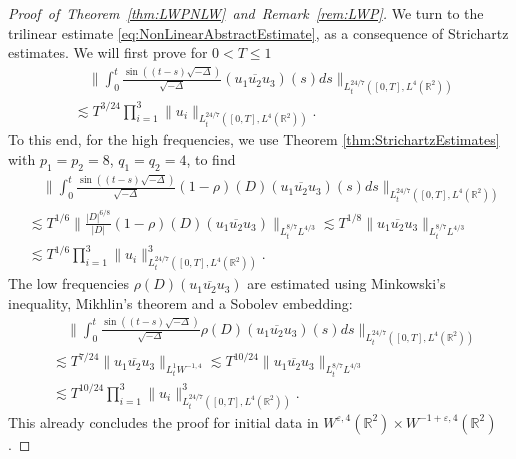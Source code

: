 \documentclass{amsart}
\theoremstyle{definition}
\newcommand{\R}{\mathbb{R}}
\newcommand {\Rtwo}{\mathbb{R}^{2}}
\newcommand {\veps}{\varepsilon}
\numberwithin{equation}{section}
\begin{document}
\begin{proof}[Proof~of~Theorem~\ref{thm:LWPNLW}~and~Remark~\ref{rem:LWP}]
We turn to the trilinear estimate \eqref{eq:NonLinearAbstractEstimate}, as a consequence of Strichartz estimates. We will first prove for $0 < T \leq 1$
\begin{equation}
\label{eq:NonlinearEstimateI}
\begin{split}
&\quad \Big\| \int_0^t \frac{\sin((t-s) \sqrt{-\Delta})}{\sqrt{-\Delta}} (u_{1}\overline{u_{2}} u_{3})(s) ds \Big\|_{L_t^{24/7}([0,T],L^4(\R^2))} \\
&\lesssim T^{3/24} \prod_{i=1}^{3}\|u_{i}\|_{L_t^{24/7}([0,T],L^4(\R^2))}.
\end{split}
\end{equation}
To this end, for the high frequencies, we use Theorem \ref{thm:StrichartzEstimates} with $p_{1}=p_{2} = 8$, $q_1=q_{2} = 4$, to find
\begin{equation*}
\begin{split}
&\quad \Big\| \int_0^t \frac{\sin((t-s) \sqrt{-\Delta})}{\sqrt{-\Delta}} (1-\rho)(D) (u_{1}\overline{u_{2}}u_{3})(s) ds \Big\|_{L_t^{24/7}([0,T],L^4(\Rtwo))} \\
&\lesssim T^{1/6} \Big\| \frac{|D|^{6/8}}{|D|} (1-\rho)(D) (u_{1}\overline{u_{2}}u_{3}) \Big\|_{L_t^{8/7} L^{4/3}} \lesssim T^{1/8} \| u_{1}\overline{u_{2}}u_{3} \|_{L_t^{8/7} L^{4/3}}\\
&\lesssim T^{1/6} \prod_{i=1}^{3}\| u_{i} \|^3_{L_t^{24/7}([0,T], L^4(\Rtwo))}.
\end{split}
\end{equation*}
The low frequencies $\rho(D) (u_{1}\overline{u_{2}}u_{3})$ are estimated using Minkowski's inequality, Mikhlin's theorem and a Sobolev embedding:
\begin{equation*}
\begin{split}
&\quad \Big\| \int_0^t \frac{\sin((t-s) \sqrt{-\Delta})}{\sqrt{-\Delta}} \rho(D) (u_{1}\overline{u_{2}}u_{3})(s) ds \Big\|_{L_t^{24/7}([0,T],L^4(\Rtwo))} \\
&\lesssim T^{7/24} \| u_{1}\overline{u_{2}}u_{3}\|_{L_t^{1} W^{-1,4}} \lesssim T^{10/24} \| u_{1}\overline{u_{2}}u_{3} \|_{L_t^{8/7} L^{4/3}}\\
&\lesssim T^{10/24} \prod_{i=1}^{3}\| u_{i} \|^3_{L_t^{24/7}([0,T], L^4(\Rtwo))}.
\end{split}
\end{equation*}
This already concludes the proof for initial data in $W^{\veps,4}(\R^{2})\times W^{-1+\veps,4}(\Rtwo)$. 


\end{proof}
\end{document}
